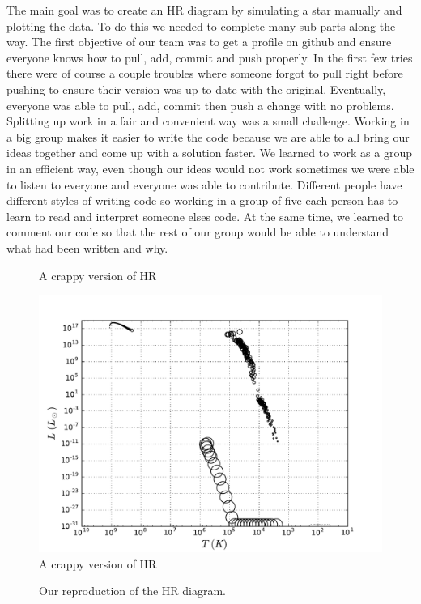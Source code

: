 \documentclass[10pt]{article}
\begin{document}
The main goal was to create an HR diagram by simulating a star manually and plotting the data. To do this we needed to complete many sub-parts along the way. The first objective of our team was to get a profile on github and ensure everyone knows how to pull, add, commit and push properly. In the first few tries there were of course a couple troubles where someone forgot to pull right before pushing to ensure their version was up to date with the original. Eventually, everyone was able to pull, add, commit then push a change with no problems. Splitting up work in a fair and convenient way was a small challenge. Working in a big group makes it easier to write the code because we are able to all bring our ideas together and come up with a solution faster. We learned to work as a group in an efficient way, even though our ideas would not work sometimes we were able to listen to everyone and everyone was able to contribute. Different people have different styles of writing code so working in a group of five each person has to learn to read and interpret someone elses code. At the same time, we learned to comment our code so that the rest of our group would be able to understand what had been written and why.\\


\begin{figure}[p]
\begin{centering}

\caption{A crappy version of HR}
\label{fig:badHR}
\end{centering}
\end{figure}

\begin{figure}[p]
\begin{centering}
\includegraphics[width=\textwidth]{new_bad_hr.pdf}
\caption{A crappy version of HR}
\label{fig:nosobadHR}
\end{centering}
\end{figure}

\begin{figure}[p]
\begin{centering}

\caption{Our reproduction of the HR diagram.}
\label{fig:HR}
\end{centering}
\end{figure}
\end{document}
